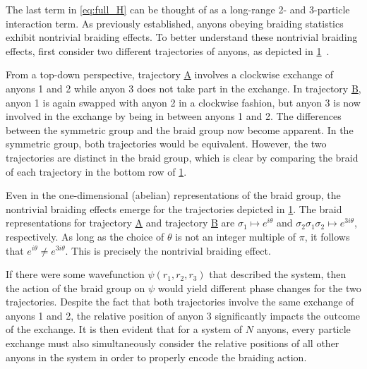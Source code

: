 The last term in \cref{eq:full_H} can be thought of as a long-range 2- and 3-particle interaction term. As previously established, anyons obeying braiding statistics exhibit nontrivial braiding effects. To better understand these nontrivial braiding effects, first consider two different trajectories of anyons, as depicted in \cref{fig:anyon_trajectores}~\cite{Khare2005}. 

From a top-down perspective, trajectory \hyperref[traj:A]{A} involves a clockwise exchange of anyons 1 and 2 while anyon 3 does not take part in the exchange. In trajectory \hyperref[traj:B]{B}, anyon 1 is again swapped with anyon 2 in a clockwise fashion, but anyon 3 is now involved in the exchange by being in between anyons 1 and 2. The differences between the symmetric group and the braid group now become apparent. In the symmetric group, both trajectories would be equivalent. However, the two trajectories are distinct in the braid group, which is clear by comparing the braid of each trajectory in the bottom row of \cref{fig:anyon_trajectores}.

\begin{figure}[htbp]
    \centering
    
    \label{fig:anyon_trajectores}
\end{figure}

Even in the one-dimensional (abelian) representations of the braid group, the nontrivial braiding effects emerge for the trajectories depicted in \cref{fig:anyon_trajectores}. The braid representations for trajectory \hyperref[traj:A]{A} and trajectory \hyperref[traj:B]{B} are $\sigma_1\mapsto e^{i\theta}$ and $\sigma_2\sigma_1\sigma_2\mapsto e^{3i\theta}$, respectively. As long as the choice of $\theta$ is not an integer multiple of $\pi$, it follows that $e^{i\theta}\neq e^{3i\theta}$. This is precisely the nontrivial braiding effect.

If there were some wavefunction $\psi(r_1,r_2,r_3)$ that described the system, then the action of the braid group on $\psi$ would yield different phase changes for the two trajectories.
Despite the fact that both trajectories involve the same exchange of anyons 1 and 2, the relative position of anyon 3 significantly impacts the outcome of the exchange. It is then evident that for a system of $N$ anyons, every particle exchange must also simultaneously consider the relative positions of all other anyons in the system in order to properly encode the braiding action.

